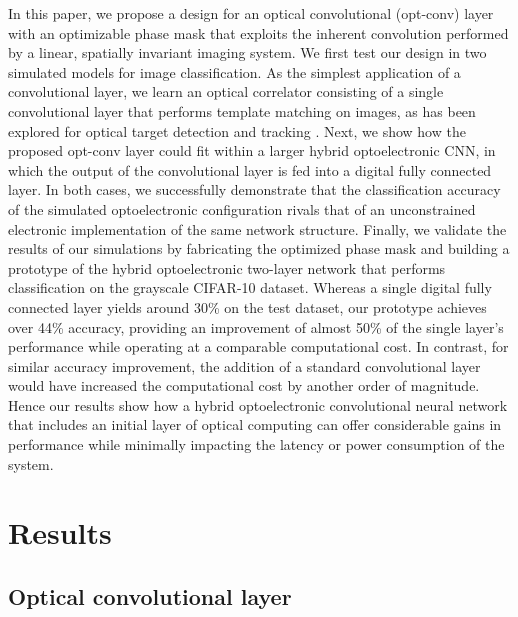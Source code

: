 \documentclass[fleqn,10pt]{wlscirep}
\begin{document}
In this paper, we propose a design for an optical convolutional (opt-conv) layer with an optimizable phase mask that exploits the inherent convolution performed by a linear, spatially invariant imaging system. We first test our design in two simulated models for image classification. As the simplest application of a convolutional layer, we learn an optical correlator consisting of a single convolutional layer that performs template matching on images, as has been explored for optical target detection and tracking \cite{gregory1986real,manzur2012optical,javidi1995optical,koppal2011wide}. Next, we show how the proposed opt-conv layer could fit within a larger hybrid optoelectronic CNN, in which the output of the convolutional layer is fed into a digital fully connected layer. In both cases, we successfully demonstrate that the classification accuracy of the simulated optoelectronic configuration rivals that of an unconstrained electronic implementation of the same network structure. Finally, we validate the results of our simulations by fabricating the optimized phase mask and building a prototype of the hybrid optoelectronic two-layer network that performs classification on the grayscale CIFAR-10 dataset. Whereas a single digital fully connected layer yields around 30\% on the test dataset, our prototype achieves over 44\% accuracy, providing an improvement of almost 50\% of the single layer's performance while operating at a comparable computational cost. In contrast, for similar accuracy improvement, the addition of a standard convolutional layer would have increased the computational cost by another order of magnitude. Hence our results show how a hybrid optoelectronic convolutional neural network that includes an initial layer of optical computing can offer considerable gains in performance while minimally impacting the latency or power consumption of the system. 


\section*{Results}

\subsection*{Optical convolutional layer}
\end{document}
